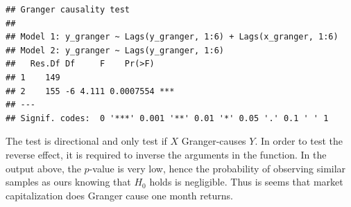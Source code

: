 \documentclass[]{krantz}
\makeatletter
\newenvironment{Shaded}{\begin{snugshade}}{\end{snugshade}}
\newcommand{\CommentTok}[1]{\textcolor[rgb]{0.37,0.37,0.37}{\textit{#1}}}
\newcommand{\DataTypeTok}[1]{\textcolor[rgb]{0.27,0.27,0.27}{#1}}
\newcommand{\DecValTok}[1]{\textcolor[rgb]{0.06,0.06,0.06}{#1}}
\newcommand{\KeywordTok}[1]{\textcolor[rgb]{0.27,0.27,0.27}{\textbf{#1}}}
\newcommand{\NormalTok}[1]{#1}
\newcommand{\OperatorTok}[1]{\textcolor[rgb]{0.43,0.43,0.43}{\textbf{#1}}}
\newcommand{\StringTok}[1]{\textcolor[rgb]{0.5,0.5,0.5}{#1}}
\newenvironment{kframe}{%
\medskip{}
\setlength{\fboxsep}{.8em}
 \def\at@end@of@kframe{}%
 \ifinner\ifhmode%
  \def\at@end@of@kframe{\end{minipage}}%
  \begin{minipage}{\columnwidth}%
 \fi\fi%
 \def\FrameCommand##1{\hskip\@totalleftmargin \hskip-\fboxsep
 \colorbox{shadecolor}{##1}\hskip-\fboxsep
     \hskip-\linewidth \hskip-\@totalleftmargin \hskip\columnwidth}%
 \MakeFramed {\advance\hsize-\width
   \@totalleftmargin\z@ \linewidth\hsize
   \@setminipage}}%
 {\par\unskip\endMakeFramed%
 \at@end@of@kframe}
\renewenvironment{Shaded}{\begin{kframe}}{\end{kframe}}
\theoremstyle{definition}
\theoremstyle{definition}
\theoremstyle{definition}
\theoremstyle{remark}
\makeatother
\begin{document}
\footnotesize

\begin{Shaded}
\end{Shaded}

\begin{verbatim}
## Granger causality test
## 
## Model 1: y_granger ~ Lags(y_granger, 1:6) + Lags(x_granger, 1:6)
## Model 2: y_granger ~ Lags(y_granger, 1:6)
##   Res.Df Df     F    Pr(>F)    
## 1    149                       
## 2    155 -6 4.111 0.0007554 ***
## ---
## Signif. codes:  0 '***' 0.001 '**' 0.01 '*' 0.05 '.' 0.1 ' ' 1
\end{verbatim}

\normalsize

The test is directional and only test if \(X\) Granger-causes \(Y\). In
order to test the reverse effect, it is required to inverse the
arguments in the function. In the output above, the \(p\)-value is very
low, hence the probability of observing similar samples as ours knowing
that \(H_0\) holds is negligible. Thus is seems that market
capitalization does Granger cause one month returns.
\end{document}
